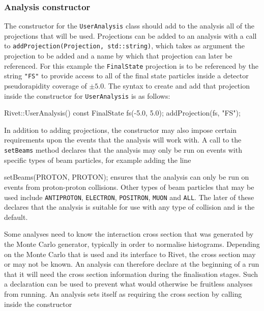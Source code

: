 \documentclass{JHEP3}
\newenvironment{snippet}{\Verbatim}{\endVerbatim}
\newcommand{\code}[1]{\texttt{#1}\xspace}
\begin{document}
\subsubsection{Analysis constructor}

The constructor for the \code{UserAnalysis} class should add to the analysis all of the projections that will be used.  Projections can be added to an analysis with a call to \code{addProjection(Projection, std::string)}, which takes as argument the projection to be added and a name by which that projection can later be referenced.  For this example the \code{FinalState} projection is to be referenced by the string \code{"FS"} to provide access to all of the final state particles inside a detector pseudorapidity coverage of $\pm5.0$.  The syntax to create and add that projection inside the constructor for \code{UserAnalysis} is as follows:

\begin{snippet}
Rivet::UserAnalysis(){
  const FinalState fs(-5.0, 5.0);
  addProjection(fs, "FS");
}
\end{snippet}

In addition to adding projections, the constructor may also impose certain requirements upon the events that the analysis will work with.  A call to the \code{setBeams} method declares that the analysis may only be run on events with specific types of beam particles, for example adding the line

\begin{snippet}
  setBeams(PROTON, PROTON);
\end{snippet}
\noindent ensures that the analysis can only be run on events from proton-proton collisions.  Other types of beam particles that may be used include \code{ANTIPROTON}, \code{ELECTRON}, \code{POSITRON}, \code{MUON} and \code{ALL}.  The later of these declares that the analysis is suitable for use with any type of collision and is the default.

Some analyses need to know the interaction cross section that was generated by the Monte Carlo generator, typically in order to normalise histograms.  Depending on the Monte Carlo that is used and its interface to Rivet, the cross section  may or may not  be known.  An analysis can therefore declare at the beginning of a run that it will need the cross section information during the finalisation stages.  Such a declaration can be used to prevent what would otherwise be fruitless analyses from running.  An analysis sets itself as requiring the cross section by calling inside the constructor
\end{document}
